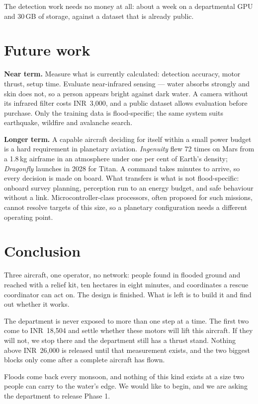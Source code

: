 \documentclass[11pt,a4paper]{article}
\newcommand{\rs}[1]{\mbox{INR~#1}}
\begin{document}
The detection work needs no money at all: about a week on a departmental GPU
and 30\,GB of storage, against a dataset that is already public.

\section{Future work}

\textbf{Near term.} Measure what is currently calculated: detection accuracy,
motor thrust, setup time. Evaluate near-infrared sensing --- water absorbs
strongly and skin does not, so a person appears bright against dark water. A
camera without its infrared filter costs \rs{3{,}000}, and a public dataset
allows evaluation before purchase. Only the training data is flood-specific; the
same system suits earthquake, wildfire and avalanche search.

\textbf{Longer term.} A capable aircraft deciding for itself within a small
power budget is a hard requirement in planetary aviation. \emph{Ingenuity} flew
72 times on Mars from a 1.8\,kg airframe in an atmosphere under one per cent of
Earth's density; \emph{Dragonfly} launches in 2028 for Titan. A command takes
minutes to arrive, so every decision is made on board. What transfers is what is
not flood-specific: onboard survey planning, perception run to an energy budget,
and safe behaviour without a link. Microcontroller-class processors, often
proposed for such missions, cannot resolve targets of this size, so a planetary
configuration needs a different operating point.

\section{Conclusion}

Three aircraft, one operator, no network: people found in flooded ground and
reached with a relief kit, ten hectares in eight minutes, and coordinates a
rescue coordinator can act on. The design is finished. What is left is to build
it and find out whether it works.

The department is never exposed to more than one step at a time. The first two
come to \rs{18{,}504} and settle whether these motors will lift this aircraft.
If they will not, we stop there and the department still has a thrust stand.
Nothing above \rs{26{,}000} is released until that measurement exists, and the
two biggest blocks only come after a complete aircraft has flown.

Floods come back every monsoon, and nothing of this kind exists at a size two
people can carry to the water's edge. We would like to begin, and we are asking
the department to release Phase 1.


\end{document}
